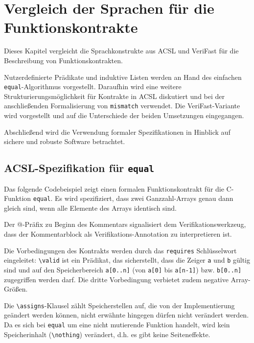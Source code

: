 ﻿\chapter{Vergleich der Sprachen für die Funktionskontrakte}
\label{sec:design-by-contract}

Dieses Kapitel vergleicht die Sprachkonstrukte aus ACSL und VeriFast für die Beschreibung von Funktionskontrakten.

Nutzerdefinierte Prädikate und induktive Listen werden an Hand des einfachen \texttt{equal}-Algorithmus vorgestellt.
Daraufhin wird eine weitere Strukturierungsmöglichkeit für Kontrakte in ACSL diskutiert und bei der anschließenden
Formalisierung von \texttt{mismatch} verwendet. Die VeriFast-Variante wird vorgestellt und auf die Unterschiede
der beiden Umsetzungen eingegangen. 

Abschließend wird die Verwendung formaler Spezifikationen in Hinblick auf sichere und robuste Software betrachtet.


\section{ACSL-Spezifikation für \texttt{equal}}
\label{sec:design-by-contract:acsl-spezifikation}

Das folgende Codebeispiel zeigt einen formalen Funktionskontrakt für die C-Funktion \texttt{equal}. Es wird
spezifiziert, dass zwei Ganzzahl-Arrays genau dann gleich sind, wenn alle Elemente des Arrays identisch sind.



Der @-Präfix zu Beginn des Kommentars signalisiert dem Verifikationswerkzeug, 
dass der Kommentarblock als Verifikations-Annotation zu interpretieren ist. 

Die Vorbedingungen des Kontrakts werden durch das \lstinline{requires} Schlüsselwort eingeleitet: \lstinline{\valid} ist ein Prädikat, 
das sicherstellt, dass die Zeiger \lstinline{a} und \lstinline{b} gültig sind und auf den Speicherbereich \lstinline{a[0..n]} 
(von \lstinline{a[0]} bis \lstinline{a[n-1]}) bzw. \lstinline{b[0..n]} zugegriffen werden darf. Die dritte Vorbedingung verbietet 
zudem negative Array-Größen.

Die \lstinline{\assigns}-Klausel zählt Speicherstellen auf, die von der Implementierung geändert werden können, nicht erwähnte
hingegen dürfen nicht verändert werden. Da es sich bei \texttt{equal} um eine nicht mutierende Funktion handelt, wird kein 
Speicherinhalt (\lstinline{\nothing}) verändert, d.h. es gibt keine Seiteneffekte.

